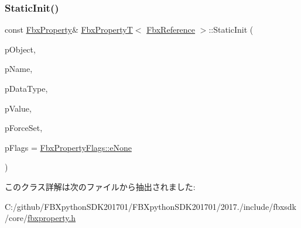 \subsubsection{\texorpdfstring{Static\+Init()}{StaticInit()}\hspace{0.1cm}{\footnotesize\ttfamily [2/2]}}
{\footnotesize\ttfamily const \hyperlink{class_fbx_property}{Fbx\+Property}\& \hyperlink{class_fbx_property_t}{Fbx\+PropertyT}$<$ \hyperlink{fbxtypes_8h_a44df6a2eec915cf27cd481e5c5e48a24}{Fbx\+Reference} $>$\+::Static\+Init (\begin{DoxyParamCaption}\item[{\hyperlink{class_fbx_object}{Fbx\+Object} $\ast$}]{p\+Object,  }\item[{const char $\ast$}]{p\+Name,  }\item[{const \hyperlink{class_fbx_data_type}{Fbx\+Data\+Type} \&}]{p\+Data\+Type,  }\item[{const \hyperlink{fbxtypes_8h_a44df6a2eec915cf27cd481e5c5e48a24}{Fbx\+Reference} \&}]{p\+Value,  }\item[{bool}]{p\+Force\+Set,  }\item[{\hyperlink{class_fbx_property_flags_afabfa7e0949aac8a7dcdf8a141867e99}{Fbx\+Property\+Flags\+::\+E\+Flags}}]{p\+Flags = {\ttfamily \hyperlink{class_fbx_property_flags_afabfa7e0949aac8a7dcdf8a141867e99ac1b9aab93d40af76eb419be426de17b1}{Fbx\+Property\+Flags\+::e\+None}} }\end{DoxyParamCaption})}



このクラス詳解は次のファイルから抽出されました\+:\begin{DoxyCompactItemize}
\item 
C\+:/github/\+F\+B\+Xpython\+S\+D\+K201701/\+F\+B\+Xpython\+S\+D\+K201701/2017./include/fbxsdk/core/\hyperlink{fbxproperty_8h}{fbxproperty.\+h}\end{DoxyCompactItemize}
